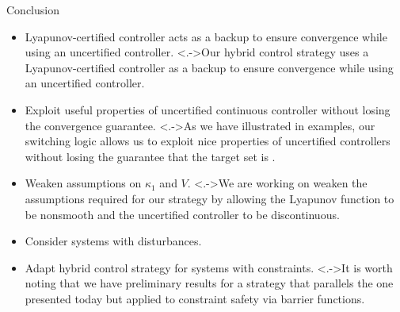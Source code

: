 \documentclass[notheorems, aspectratio=169, presentation]{beamer}
\newcommand{\itemnote}[1]{\note[item]<.->{#1}}
\begin{document}
\begin{frame}{Conclusion}
  
  \begin{itemize}[<+->]
    \item Lyapunov-certified 
      controller acts as a backup to ensure convergence 
      while using an uncertified controller.
    \itemnote{Our hybrid control strategy uses a Lyapunov-certified controller as a 
    backup to ensure convergence while using an uncertified controller.
    }
    \item Exploit useful properties of  
    uncertified continuous controller without losing the convergence guarantee.
    \itemnote{As we have illustrated in examples, 
      our switching logic allows us to exploit nice properties of 
      uncertified controllers without losing the guarantee that the target set is \UGAS.}

  \end{itemize}

  \begin{itemize}[<+->]
    \item Weaken assumptions on $\kappa_1$ and $V$.
    \itemnote{We are working on weaken the assumptions required for our 
    strategy by allowing the Lyapunov function to be nonsmooth and the 
    uncertified controller to be discontinuous.} 
    \item Consider systems with disturbances.
    \item Adapt hybrid control strategy for systems with constraints.
    \itemnote{It is worth noting that we have preliminary results 
    for a strategy that parallels the one presented today but applied to 
    constraint safety via barrier functions.}
  \end{itemize}


\end{frame}

\begin{frame}
  \vspace{0.4in}
  \begin{center}
      \Huge
  \end{center}
\end{frame}
\end{document}
